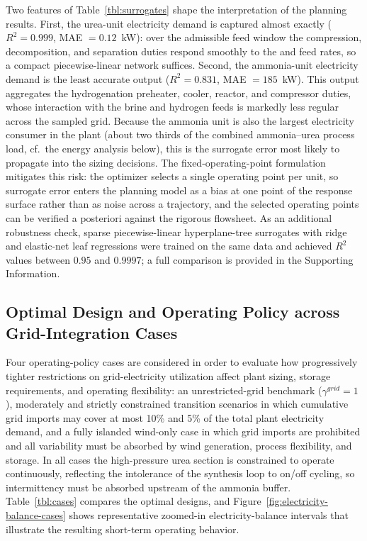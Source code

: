 \documentclass[letterpaper]{article}
\begin{document}
Two features of Table~\ref{tbl:surrogates} shape the interpretation
of the planning results. First, the urea-unit electricity demand is
captured almost exactly ($R^2 = 0.999$, MAE $=0.12$~kW): over the
admissible feed window the compression, decomposition, and separation
duties respond smoothly to the  and  feed rates, so a
compact piecewise-linear network suffices. Second, the ammonia-unit
electricity demand is the least accurate output ($R^2 = 0.831$, MAE
$=185$~kW). This output aggregates the hydrogenation preheater,
cooler, reactor, and compressor duties, whose interaction with the
brine and hydrogen feeds is markedly less regular across the sampled
grid. Because the ammonia unit is also the largest electricity
consumer in the plant (about two thirds of the combined
ammonia--urea process load, cf.\ the energy analysis below), this is
the surrogate error most likely to propagate into the sizing
decisions. The fixed-operating-point formulation mitigates this risk:
the optimizer selects a single operating point per unit, so surrogate
error enters the planning model as a bias at one point of the
response surface rather than as noise across a trajectory, and the
selected operating points can be verified a posteriori against the
rigorous flowsheet. As an additional robustness check, sparse
piecewise-linear hyperplane-tree surrogates with ridge and
elastic-net leaf regressions were trained on the same data and
achieved $R^2$ values between $0.95$ and $0.9997$; a full comparison
is provided in the Supporting Information.

\subsection{Optimal Design and Operating Policy across
  Grid-Integration Cases}

Four operating-policy cases are considered in order to evaluate how
progressively tighter restrictions on grid-electricity utilization
affect plant sizing, storage requirements, and operating
flexibility: an unrestricted-grid benchmark
($\gamma^{grid}=1$), moderately and strictly constrained transition
scenarios in which cumulative grid imports may cover at most 10\% and
5\% of the total plant electricity demand, and a fully islanded
wind-only case in which grid imports are prohibited and all
variability must be absorbed by wind generation, process flexibility,
and storage. In all cases the high-pressure urea section is
constrained to operate continuously, reflecting the intolerance of
the synthesis loop to on/off cycling, so intermittency must be
absorbed upstream of the ammonia buffer. Table~\ref{tbl:cases}
compares the optimal designs, and
Figure~\ref{fig:electricity-balance-cases} shows representative
zoomed-in electricity-balance intervals that illustrate the resulting
short-term operating behavior.
\end{document}
